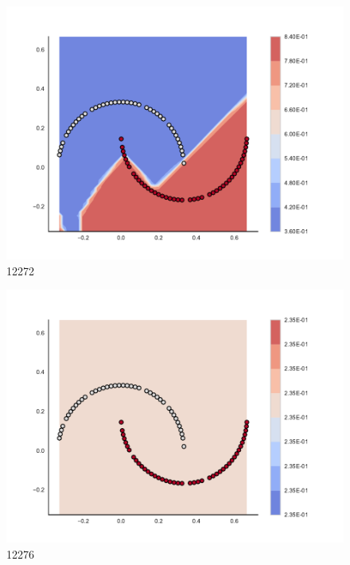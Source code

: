 \begin{subfigure}[b]{0.09\textwidth}
    \includegraphics[clip, trim=2.35cm 1.75cm 4.5cm 0cm,width=\textwidth]{img/convergence/12272.pdf}
    \caption{12272}
    \label{fig:convergence_12272}
\end{subfigure}
%
\begin{subfigure}[b]{0.09\textwidth}
    \includegraphics[clip, trim=2.35cm 1.75cm 4.5cm 0cm,width=\textwidth]{img/convergence/12276.pdf}
    \caption{12276}
    \label{fig:convergence_12276}
\end{subfigure}
%
